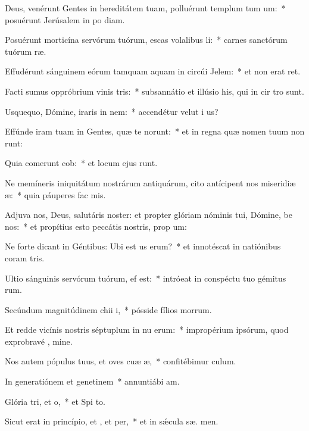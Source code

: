 \item Deus, venérunt Gentes in hereditátem tuam, polluérunt templum tum um:~* posuérunt Jerúsalem in po diam.
\item Posuérunt morticína servórum tuórum, escas volalibus li:~* carnes sanctórum tuórum  ræ.
\item Effudérunt sánguinem eórum tamquam aquam in circúi Jelem:~* et non erat  ret.
\item Facti sumus oppróbrium vinis tris:~* subsannátio et illúsio his, qui in cir tro sunt.
\item Usquequo, Dómine, iraris in nem:~* accendétur velut i  us?
\item Effúnde iram tuam in Gentes, quæ te  norunt:~* et in regna quæ nomen tuum non runt:
\item Quia comerunt cob:~* et locum ejus runt.
\item Ne memíneris iniquitátum nostrárum antiquárum, cito antícipent nos miseridiæ æ:~* quia páuperes fac  mis.
\item Adjuva nos, Deus, salutáris noster: et propter glóriam nóminis tui, Dómine, be nos:~* et propítius esto peccátis nostris, prop  um:
\item Ne forte dicant in Géntibus: Ubi est us erum?~* et innotéscat in natiónibus coram  tris.
\item Ultio sánguinis servórum tuórum,  ef est:~* intróeat in conspéctu tuo gémitus rum.
\item Secúndum magnitúdinem chii i,~* pósside fílios morrum.
\item Et redde vicínis nostris séptuplum in nu erum:~* impropérium ipsórum, quod exprobravé , mine.
\item Nos autem pópulus tuus, et oves cuæ æ,~* confitébimur   culum.
\item In generatiónem et genetinem~* annuntiábi  am.
\item Glória tri, et o,~* et Spi to.
\item Sicut erat in princípio, et , et per,~* et in sǽcula sæ. men.
